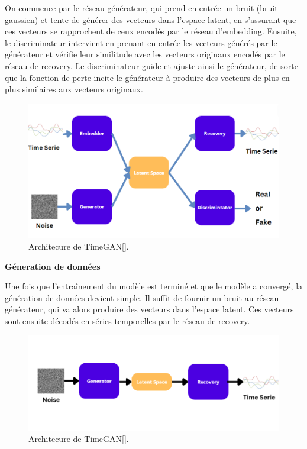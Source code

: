 On commence par le réseau générateur, qui prend en entrée un bruit (bruit
gaussien) et tente de générer des vecteurs dans l'espace latent, en s'assurant
que ces vecteurs se rapprochent de ceux encodés par le réseau d'embedding.
Ensuite, le discriminateur intervient en prenant en entrée les vecteurs générés
par le générateur et vérifie leur similitude avec les vecteurs originaux
encodés par le réseau de recovery. Le discriminateur guide et ajuste ainsi le
générateur, de sorte que la fonction de perte incite le générateur à produire
des vecteurs de plus en plus similaires aux vecteurs originaux.

\begin{figure}[hbt!]
  \centering
  \includegraphics[width=14cm]{images_pfe/timegan_archi_.png}
  \caption{Architecure de TimeGAN[\cite{yoon2019time}].}
  \label{fig:timegan}
\end{figure}
\FloatBarrier

\textbf{Géneration de données}

Une fois que l'entraînement du modèle est terminé et que le modèle a convergé,
la génération de données devient simple. Il suffit de fournir un bruit au
réseau générateur, qui va alors produire des vecteurs dans l'espace latent. Ces
vecteurs sont ensuite décodés en séries temporelles par le réseau de recovery.

\begin{figure}[hbt!]
  \centering
  \includegraphics[width=14cm]{images_pfe/gents.png}
  \caption{Architecure de TimeGAN[\cite{yoon2019time}].}
  \label{fig:timegan}
\end{figure}
\FloatBarrier

